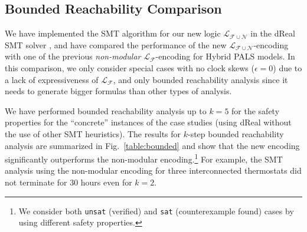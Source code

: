 \subsection{Bounded Reachability Comparison}
\label{sec:expr}

We have implemented the SMT algorithm
for our new logic $\mathcal{L}_{\mathcal{F}\cup\mathcal{N}}$ in the \textsf{dReal} SMT solver \cite{dReal},
and have compared the performance of 
the new $\mathcal{L}_{\mathcal{F}\cup\mathcal{N}}$-encoding
with one of the previous \emph{non-modular} $\mathcal{L}_{\mathcal{F}}$-encoding  for Hybrid PALS models.
%
In this comparison,
we only consider special cases %
with no clock skews ($\epsilon = 0$) 
due to a lack of expressiveness of  $\mathcal{L}_{\mathcal{F}}$,
and only bounded reachability analysis
since it needs to generate bigger formulas than other types of analysis.


We have performed bounded reachability analysis up to $k = 5$
for the safety properties for the ``concrete'' instances of the case studies
(using \textsf{dReal} without the use of other SMT heuristics).
The results for $k$-step bounded reachability analysis 
are summarized  in Fig.~\ref{table:bounded} and show that
%
the new encoding significantly outperforms 
the non-modular encoding.\footnote{We consider both \texttt{unsat} (verified) and \texttt{sat}  (counterexample found) cases
by using different safety properties.}
For example, 
the SMT analysis using the non-modular encoding
for  three interconnected thermostats
 did not terminate for $30$ hours
even for $k = 2$.



